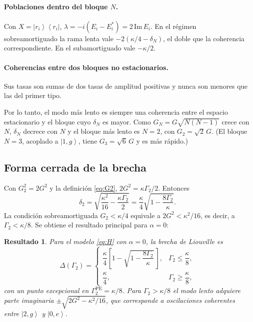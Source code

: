 \documentclass[11pt]{report}
\newtheorem{resultado}{Resultado}
\newcommand{\ket}[1]{\left|#1\right\rangle}
\newcommand{\bra}[1]{\left\langle#1\right|}
\newcommand{\GG}{\Gamma_{2}}
\begin{document}
\paragraph{Poblaciones dentro del bloque $N$.} Con $X=\ket{r_{i}}\bra{r_{i}}$, $\lambda=-i(E_{i}-E_{i}^{*})=2\,\mathrm{Im}\,E_{i}$. En el r\'egimen sobreamortiguado la rama lenta vale $-2(\kappa/4-\delta_{N})$, el doble que la coherencia correspondiente. En el subamortiguado vale $-\kappa/2$.

\paragraph{Coherencias entre dos bloques no estacionarios.} Sus tasas son sumas de dos tasas de amplitud positivas y nunca son menores que las del primer tipo.

Por lo tanto, el modo m\'as lento es siempre una coherencia entre el espacio estacionario y el bloque cuyo $\delta_{N}$ es mayor. Como $G_{N}=G\sqrt{N(N-1)}$ crece con $N$, $\delta_{N}$ decrece con $N$ y el bloque m\'as lento es $N=2$, con $G_{2}=\sqrt{2}\,G$. (El bloque $N=3$, acoplado a $\ket{1,g}$, tiene $G_{3}=\sqrt{6}\,G$ y es m\'as r\'apido.)

\subsection{Forma cerrada de la brecha}

Con $G_{2}^{2}=2G^{2}$ y la definici\'on \eqref{eq:G2}, $2G^{2}=\kappa\GG/2$. Entonces
\begin{equation}
\delta_{2} = \sqrt{\frac{\kappa^{2}}{16}-\frac{\kappa\GG}{2}} = \frac{\kappa}{4}\sqrt{1-\frac{8\GG}{\kappa}} .
\end{equation}
La condici\'on sobreamortiguada $G_{2}<\kappa/4$ equivale a $2G^{2}<\kappa^{2}/16$, es decir, a $\GG<\kappa/8$. Se obtiene el resultado principal para $\alpha=0$:

\begin{resultado}
Para el modelo \eqref{eq:H} con $\alpha=0$, la brecha de Liouville es
\begin{equation}
\boxed{
\Delta(\GG)=
\begin{cases}
\dfrac{\kappa}{4}\left[1-\sqrt{1-\dfrac{8\GG}{\kappa}}\,\right], & \GG\leq \dfrac{\kappa}{8},\\[3ex]
\dfrac{\kappa}{4}, & \GG\geq \dfrac{\kappa}{8},
\end{cases}}
\label{eq:gapexact}
\end{equation}
con un punto excepcional en $\GG^{\mathrm{PE}}=\kappa/8$. Para $\GG>\kappa/8$ el modo lento adquiere parte imaginaria $\pm\sqrt{2G^{2}-\kappa^{2}/16}$, que corresponde a oscilaciones coherentes entre $\ket{2,g}$ y $\ket{0,e}$.
\end{resultado}
\end{document}
